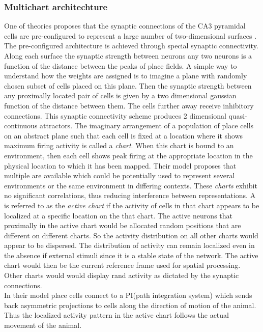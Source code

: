 \subsubsection{Multichart architechture}
\label{pathIntegration}
One of theories proposes that the synaptic connections of the CA3 pyramidal cells are pre-configured to represent a large number of two-dimensional surfaces \cite{Samsonovich1997}. The pre-configured architecture is achieved through special synaptic connectivity. Along each surface the synaptic strength between neurons any two neurons is a function of the distance between the peaks of place fields.  %
A simple way to understand how the weights are assigned is to imagine a plane with randomly chosen subset of cells placed on this plane. Then the synaptic strength between any proximally located pair of cells is given by a two dimensional gaussian function of the distance between them. The cells further away receive inhibitory connections. This synaptic connectivity scheme produces 2 dimensional quasi-continuous attractors. The imaginary arrangement of a population of place cells on an abstract plane such that each  cell is fixed at a location where it shows maximum firing activity is called a \emph{chart}. When this chart is bound to an environment, then each cell shows peak firing at the appropriate location in the physical location to which it has been mapped. Their model proposes that multiple  are available which could be potentially used to represent several environments or the same environment in differing contexts. These \emph{charts} exhibit no significant correlations, thus reducing  interference between representations. A  is referred to as the \emph{active chart} if the activity of cells in that chart appears to be localized at a specific location on the that chart. The active neurons that proximally in the active chart would be allocated random positions that are different on different charts. So the activity distribution on all other charts would appear to be dispersed. The distribution of activity can remain localized even in the absence if external stimuli since it is a stable state of the network. The active chart would then be the current reference frame used for spatial processing. Other charts would would display rand activity as dictated by the synaptic connections. \\
In their model place cells connect to a PI(path integration system) which sends back asymmetric projections to cells along the direction of motion of the animal. Thus the localized activity pattern in the active chart follows the actual movement of the animal.

